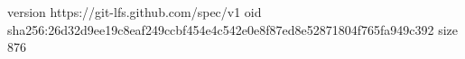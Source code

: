 version https://git-lfs.github.com/spec/v1
oid sha256:26d32d9ee19c8eaf249ccbf454e4c542e0e8f87ed8e52871804f765fa949c392
size 876
